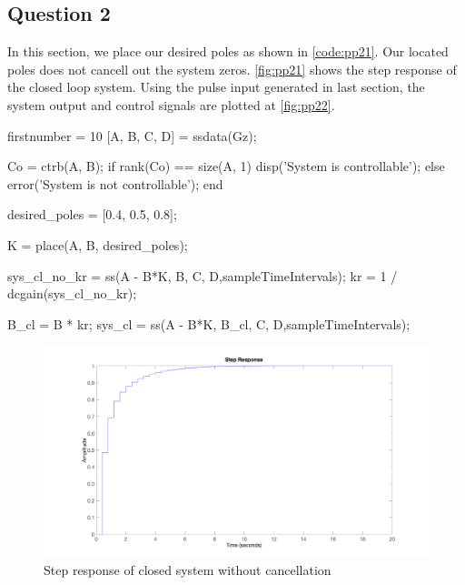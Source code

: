 \FloatBarrier
\subsection{Question 2}
In this section, we place our desired poles as shown in \autoref{code:pp21}. Our located poles does not cancell out the system zeros.  \autoref{fig:pp21} shows the step response of the closed loop system. Using the pulse input generated in last section, the system output and control signals are plotted at \autoref{fig:pp22}.

\begin{code}
	\begin{matlabcode}{firstnumber = 10}
	[A, B, C, D] = ssdata(Gz);
	
	Co = ctrb(A, B);
	if rank(Co) == size(A, 1)
	disp('System is controllable');
	else
	error('System is not controllable');
	end
	
	desired_poles = [0.4, 0.5, 0.8]; 
	
	K = place(A, B, desired_poles);
	
	sys_cl_no_kr = ss(A - B*K, B, C, D,sampleTimeIntervals);
	kr = 1 / dcgain(sys_cl_no_kr);
	
	B_cl = B * kr;
	sys_cl = ss(A - B*K, B_cl, C, D,sampleTimeIntervals);
	\end{matlabcode}
	\label{code:pp21}
\end{code}

\begin{figure}
	\centering
	\includegraphics[width=\textwidth]{images/pp21.png}
	\caption{Step response of closed system without cancellation}
	\label{fig:pp21}
\end{figure}

